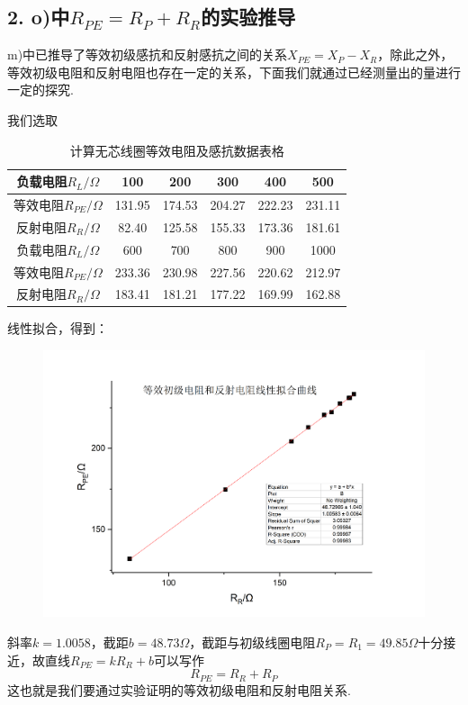 \documentclass[UTF8]{ctexart}
\begin{document}
\subsection*{2. o)中$R_{PE}=R_P+R_R$的实验推导}
m)中已推导了等效初级感抗和反射感抗之间的关系$X_{PE}=X_P-X_R$，除此之外，等效初级电阻和反射电阻也存在一定的关系，下面我们就通过已经测量出的量进行一定的探究. \par
我们选取
\begin{table}[H]\begin{center}
    \caption{计算无芯线圈等效电阻及感抗数据表格}
    \begin{tabular}{|c|c|c|c|c|c|}
        \hline
        \hline
    负载电阻$R_L/\Omega$&100&200&300&400&500\\
    \hline
    等效电阻$R_{PE}/\Omega$&131.95&174.53&204.27&222.23&231.11\\
    \hline
    反射电阻$R_R/\Omega$&82.40&125.58&155.33&173.36&181.61\\
    \hline
    \hline
    负载电阻$R_L/\Omega$&600&700&800&900&1000\\
    \hline
    等效电阻$R_{PE}/\Omega$&233.36&230.98&227.56&220.62&212.97\\
    \hline
    反射电阻$R_R/\Omega$&183.41&181.21&177.22&169.99&162.88\\
    \hline
    \end{tabular}
\end{center}\end{table}
\vspace{-2em}
线性拟合，得到：
\begin{figure}[H]\begin{center}
    \includegraphics*[scale = 0.5]{linear3.png}
\end{center}\end{figure}
斜率$k=1.0058$，截距$b=48.73\Omega$，截距与初级线圈电阻$R_P=R_1=49.85\Omega$十分接近，故直线$R_{PE}=kR_R+b$可以写作
\begin{equation}
    R_{PE}=R_R+R_P
\end{equation}
这也就是我们要通过实验证明的等效初级电阻和反射电阻关系.
\end{document}
